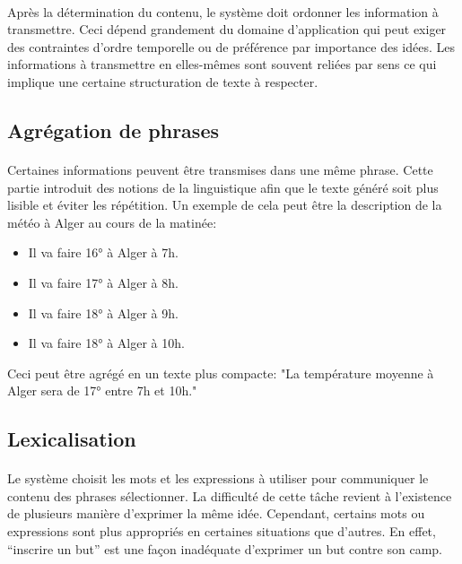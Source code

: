 	\paragraph{}
	Après la détermination du contenu, le système doit ordonner les information à transmettre. Ceci dépend grandement du domaine d’application qui peut exiger des contraintes d’ordre temporelle ou de préférence par importance des idées. Les informations à transmettre en elles-mêmes sont souvent reliées par sens ce qui implique une certaine structuration de texte à respecter.\newpage
	\subsection{Agrégation de phrases}
	\paragraph{}
	Certaines informations peuvent être transmises dans une même phrase. Cette partie introduit des notions de la linguistique afin que le texte généré soit plus lisible et éviter les répétition. Un exemple de cela peut être la description de la météo à Alger au cours de la matinée:
	\begin{itemize}
		\item Il va faire 16° à Alger à 7h.
		\item Il va faire 17° à Alger à 8h.
		\item Il va faire 18° à Alger à 9h.
		\item Il va faire 18° à Alger à 10h.
	\end{itemize}
	Ceci peut être agrégé en un texte plus compacte: "La température moyenne à Alger sera de 17° entre 7h et 10h."
	
	\subsection{Lexicalisation}
	\paragraph{}Le système choisit les mots et les expressions à utiliser pour communiquer le contenu des phrases sélectionner. La difficulté de cette tâche revient à l’existence de plusieurs manière d’exprimer la même idée. Cependant, certains mots ou expressions sont plus appropriés en certaines situations que d’autres. En effet, “inscrire un but” est une façon inadéquate d’exprimer un but contre son camp\cite{Gatt2018}.
	
